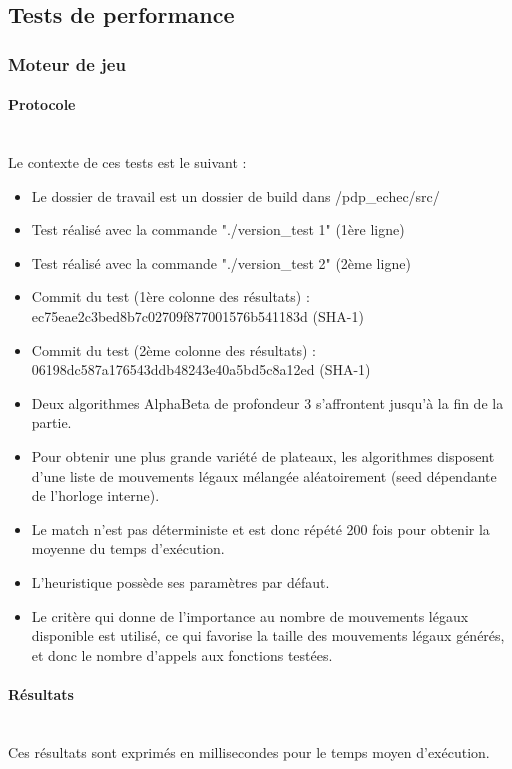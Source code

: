 \huge\documentclass{article}
\begin{document}
    \subsection{Tests de performance}
    \subsubsection{Moteur de jeu}
    \paragraph{Protocole}
    ~~\\
    \newline
    Le contexte de ces tests est le suivant :
    \begin{itemize}
        \item Le dossier de travail est un dossier de build dans /pdp\_echec/src/
        \item Test réalisé avec la commande "./version\_test 1" (1ère ligne)
        \item Test réalisé avec la commande "./version\_test 2" (2ème ligne)
        \item Commit du test (1ère colonne des résultats) : ec75eae2c3bed8b7c02709f877001576b541183d (SHA-1)
        \item Commit du test (2ème colonne des résultats) : 06198dc587a176543ddb48243e40a5bd5c8a12ed (SHA-1)
        \item Deux algorithmes AlphaBeta de profondeur 3 s'affrontent jusqu'à la fin de la partie.
        \item Pour obtenir une plus grande variété de plateaux, les algorithmes disposent d'une liste de mouvements légaux mélangée aléatoirement (seed dépendante de l'horloge interne).
        \item Le match n'est pas déterministe et est donc répété 200 fois pour obtenir la moyenne du temps d'exécution.
        \item L'heuristique possède ses paramètres par défaut.
        \item Le critère qui donne de l'importance au nombre de mouvements légaux disponible est utilisé, ce qui favorise la taille des mouvements légaux générés, et donc le nombre d'appels aux fonctions testées.
    \end{itemize}


    \paragraph{Résultats} \label{resultats_moteur}
    ~~\\
    \newline
    Ces résultats sont exprimés en millisecondes pour le temps moyen d'exécution.
\end{document}
